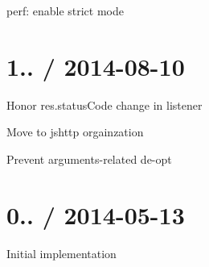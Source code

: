 
\begin{DoxyItemize}
\item perf\+: enable strict mode
\end{DoxyItemize}

\section*{1.. / 2014-\/08-\/10 }


\begin{DoxyItemize}
\item Honor {\ttfamily res.\+status\+Code} change in {\ttfamily listener}
\item Move to {\ttfamily jshttp} orgainzation
\item Prevent {\ttfamily arguments}-\/related de-\/opt
\end{DoxyItemize}

\section*{0.. / 2014-\/05-\/13 }


\begin{DoxyItemize}
\item Initial implementation 
\end{DoxyItemize}